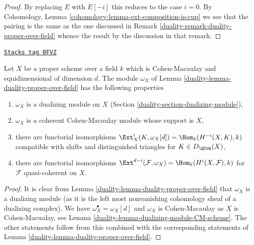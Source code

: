 \begin{proof}

By replacing $E$ with $E[-i]$ this reduces to the case $i = 0$.
By Cohomology, Lemma \ref{cohomology-lemma-ext-composition-is-cup}
we see that the pairing is the same as the one discussed
in Remark \ref{duality-remark-duality-proper-over-field}
whence the result by the discussion in that remark.
\end{proof}

\begin{lemma}
\label{duality-lemma-duality-proper-over-field-CM}
\href{https://stacks.math.columbia.edu/tag/0FVZ}{\texttt{Stacks tag 0FVZ}}

Let $X$ be a proper scheme over a field $k$ which is Cohen-Macaulay
and equidimensional of dimension $d$. The module $\omega_X$
of Lemma \ref{duality-lemma-duality-proper-over-field} has the following properties
\begin{enumerate}
\item $\omega_X$ is a dualizing module on $X$
(Section \ref{duality-section-dualizing-module}),
\item $\omega_X$ is a coherent Cohen-Macaulay module whose support is $X$,
\item there are functorial isomorphisms
$\Ext^i_X(K, \omega_X[d]) = \Hom_k(H^{-i}(X, K), k)$
compatible with shifts and distinguished triangles for $K \in D_\QCoh(X)$,
\item there are functorial isomorphisms
$\Ext^{d - i}(\mathcal{F}, \omega_X) = \Hom_k(H^i(X, \mathcal{F}), k)$
for $\mathcal{F}$ quasi-coherent on $X$.
\end{enumerate}
\end{lemma}

\begin{proof}

It is clear from Lemma \ref{duality-lemma-duality-proper-over-field}
that $\omega_X$ is a dualizing module (as it is the left most
nonvanishing cohomology sheaf of a dualizing complex).
We have $\omega_X^\bullet = \omega_X[d]$ and $\omega_X$ is Cohen-Macaulay
as $X$ is Cohen-Macualay, see Lemma \ref{duality-lemma-dualizing-module-CM-scheme}.
The other statements follow from this combined with the
corresponding statements of Lemma \ref{duality-lemma-duality-proper-over-field}.
\end{proof}

